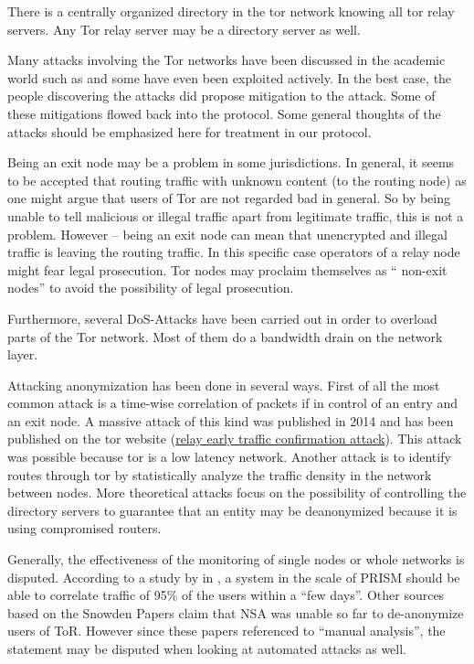 There is a centrally organized directory in the tor network knowing all tor relay servers. Any Tor relay server may be a directory server as well. 

Many attacks involving the Tor networks have been discussed in the academic world such as \cite{hs-attack06,esorics13-cellflood,bauer:wpes2007,esorics12-torscan,oakland2013-trawling,danner-et-al:tissec12,congestion-longpaths} and some have even been exploited actively. In the best case, the people discovering the attacks did propose mitigation to the attack. Some of these mitigations flowed back into the protocol. Some general thoughts of the attacks should be emphasized here for treatment in our protocol.

Being an exit node may be a problem in some jurisdictions. In general, it seems to be accepted that routing traffic with unknown content (to the routing node) as one might argue that users of Tor are not regarded bad in general. So by being unable to tell malicious or illegal traffic apart from legitimate traffic, this is not a problem. However -- being an exit node can mean that unencrypted and illegal traffic is leaving the routing traffic. In this specific case operators of a relay node might fear legal prosecution. Tor nodes may proclaim themselves as  `` non-exit nodes''  to avoid the possibility of legal prosecution.

Furthermore, several DoS-Attacks have been carried out in order to overload parts of the Tor network. Most of them do a bandwidth drain on the network layer.

Attacking anonymization has been done in several ways. First of all the most common attack is a time-wise correlation of packets if in control of an entry and an exit node. A massive attack of this kind was published in 2014 and has been published on the tor website (\href{https://blog.torproject.org/blog/tor-security-advisory-relay-early-traffic-confirmation-attack}{relay early traffic confirmation attack}). This attack was possible because tor is a low latency network. Another attack is to identify routes through tor by statistically analyze the traffic density in the network between nodes. More theoretical attacks focus on the possibility of controlling the directory servers to guarantee that an entity may be deanonymized because it is using compromised routers.

Generally, the effectiveness of the monitoring of single nodes or whole networks is disputed. According to a study by \citeauthor{ccs2013-usersrouted} in \citeyear{ccs2013-usersrouted}\cite{ccs2013-usersrouted}, a system in the scale of PRISM should be able to correlate traffic of 95\% of the users within a ``few days''. Other sources based on the Snowden Papers claim that NSA was unable so far to de-anonymize users of  ToR. However since these papers referenced to ``manual analysis'', the statement may be disputed when looking at automated attacks as well.

